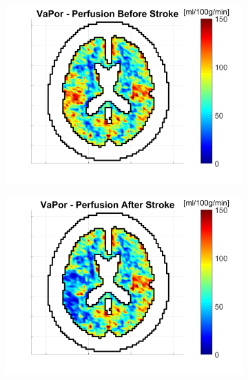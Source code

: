 \documentclass[11pt,english,a4paper,twoside,openright]{report}
\begin{document}
{{{{{{{\begin{figure}[h]
	\centering
	\begin{subfigure}[b]{0.49\textwidth}
		\includegraphics[width=\textwidth]{Chapter5/Chapter5_StrokePerfusion1}
	\end{subfigure}
	\begin{subfigure}[b]{0.49\textwidth}
		\includegraphics[width=\textwidth]{Chapter5/Chapter5_StrokePerfusion2}
	\end{subfigure}
	\begin{subfigure}[b]{0.49\textwidth}

\end{subfigure}
\end{figure}}}}}}}}
\end{document}
